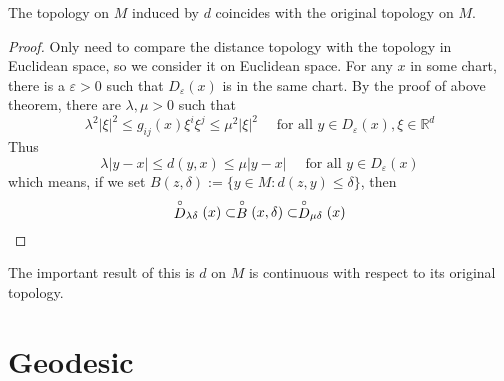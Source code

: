 \begin{enumerate}[label=\arabic{*}.]
	\begin{cor}\label{cor:metrixspace}
		The topology on $M$ induced by $d$ coincides with the original topology on $M$.
	\end{cor}
	\begin{proof}
		Only need to compare the distance topology with the topology in Euclidean space, so we consider it on Euclidean space. For any $x$ in some chart, there is a $\varepsilon > 0$ such that $D_\varepsilon(x)$ is in the same chart. By the proof of above theorem, there are $\lambda,\mu > 0$ such that
		\begin{equation*}
			\lambda^2|\xi|^2 \leq g_{i j}(x) \xi^i \xi^j \leq \mu^2|\xi|^2 \quad \text { for all } y \in D_{\varepsilon}(x), \xi \in \mathbb{R}^d
		\end{equation*}
		Thus
		\begin{equation*}
			\lambda|y-x| \leq d(y, x) \leq \mu|y-x| \quad \text { for all } y \in D_{\varepsilon}(x)
		\end{equation*}
		which means, if we set $B(z, \delta):=\{y \in M: d(z, y) \leq \delta\}$, then
		\begin{equation*}
			\stackrel{\circ}{D}_{\lambda \delta}(x) \subset \stackrel{\circ}{B}(x, \delta) \subset \stackrel{\circ}{D}_{\mu \delta}(x) \qedhere
		\end{equation*}
	\end{proof}
	\begin{rmk}
		The important result of this is $d$ on $M$ is continuous with respect to its original topology.
	\end{rmk}
\end{enumerate}

\section{Geodesic}

